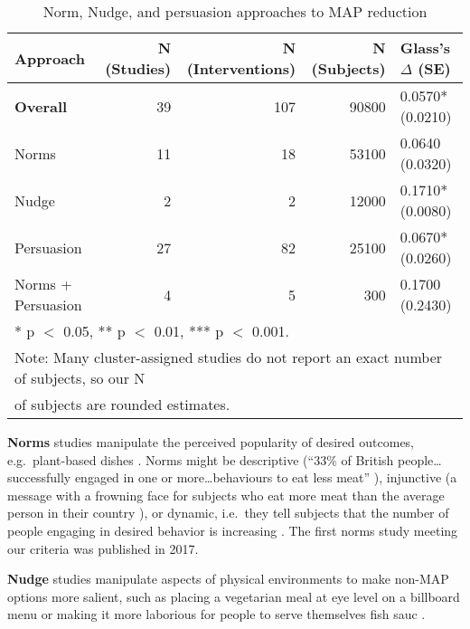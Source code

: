 \documentclass[sn-nature,pdflatex]{sn-jnl}
\begin{document}
\begin{table}[!h]
\centering
\caption{\label{tab:tab:table_one}Norm, Nudge, and persuasion approaches to MAP reduction}
\centering
\begin{tabular}[t]{lrrrl}
\toprule
Approach & N (Studies) & N (Interventions) & N (Subjects) & Glass's $\Delta$ (SE)\\
\midrule
\textbf{Overall} & 39 & 107 & 90800 & 0.0570* (0.0210)\\
Norms & 11 & 18 & 53100 & 0.0640 (0.0320)\\
Nudge & 2 & 2 & 12000 & 0.1710* (0.0080)\\
Persuasion & 27 & 82 & 25100 & 0.0670* (0.0260)\\
Norms + Persuasion & 4 & 5 & 300 & 0.1700 (0.2430)\\
\bottomrule
\multicolumn{5}{l}{\rule{0pt}{1em}* p $<$ 0.05, ** p $<$ 0.01, *** p $<$ 0.001.}\\
\multicolumn{5}{l}{\textsuperscript{} Note: Many cluster-assigned studies do not report an exact number of subjects, \linebreak so our N}\\
\multicolumn{5}{l}{of subjects are rounded estimates.}\\
\end{tabular}
\end{table}

\textbf{Norms} studies
\citep{aldoh2023, allen2002, alblas2023, coker2022, griesoph2021, piester2020, sparkman2017, sparkman2020}
manipulate the perceived popularity of desired outcomes,
e.g.~plant-based dishes \citep{sparkman2017}. Norms might be descriptive
(``33\% of British people\ldots successfully engaged in one or
more\ldots behaviours to eat less meat'' \citep{aldoh2023}), injunctive
(a message with a frowning face for subjects who eat more meat than the
average person in their country \citep{alblas2023}), or dynamic,
i.e.~they tell subjects that the number of people engaging in desired
behavior is increasing
\citep{aldoh2023, coker2022, sparkman2017, sparkman2020}. The first
norms study meeting our criteria was published in 2017.

\textbf{Nudge} studies \citep{andersson2021, kanchanachitra2020}
manipulate aspects of physical environments to make non-MAP options more
salient, such as placing a vegetarian meal at eye level on a billboard
menu \citep{andersson2021} or making it more laborious for people to
serve themselves fish sauc \citep{kanchanachitra2020}.
\end{document}
